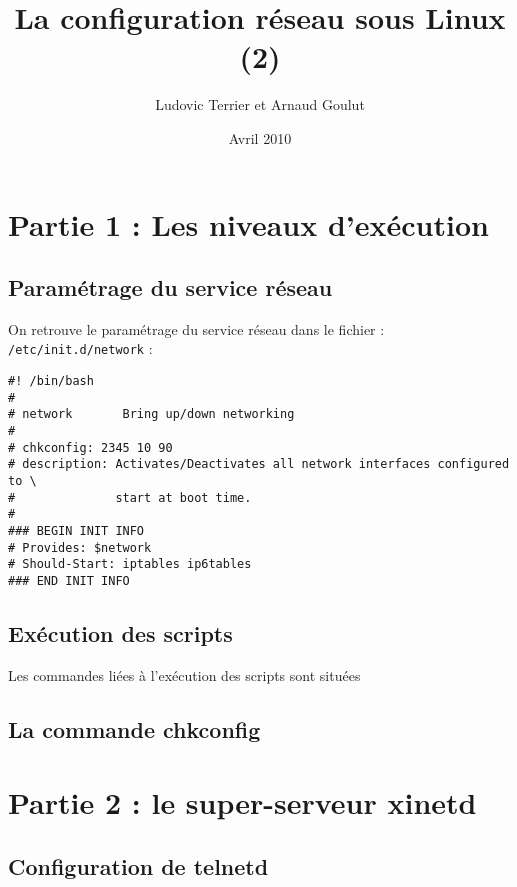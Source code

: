 \documentclass[12pt,a4paper,notitlepage]{article}
\begin{document}
\title{La configuration réseau sous Linux (2)}
\author{Ludovic Terrier et Arnaud Goulut}
\date{Avril 2010}
\maketitle



\thispagestyle{empty}
\newpage



\section{Partie 1 : Les niveaux d'exécution}

\subsection{Paramétrage du service réseau}
On retrouve le paramétrage du service réseau dans le fichier : \texttt{/etc/init.d/network} :

\begin{lstlisting}
#! /bin/bash
#
# network       Bring up/down networking
#
# chkconfig: 2345 10 90
# description: Activates/Deactivates all network interfaces configured to \
#              start at boot time.
#
### BEGIN INIT INFO
# Provides: $network
# Should-Start: iptables ip6tables
### END INIT INFO\end{lstlisting}


\subsection{Exécution des scripts}

Les commandes liées à l'exécution des scripts sont situées 


\subsection{La commande chkconfig}



\section{Partie 2 : le super-serveur xinetd}
\subsection{Configuration de telnetd}
 
\end{document}
